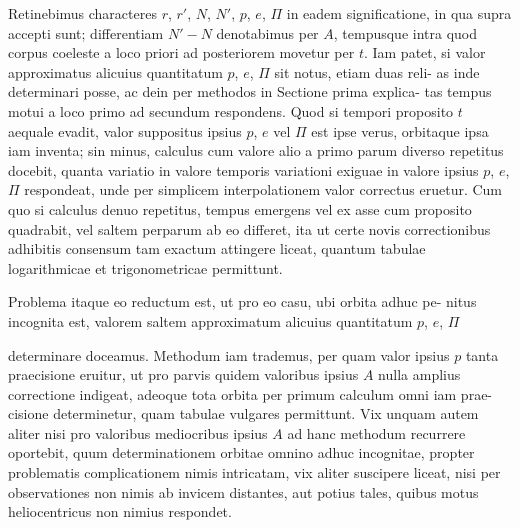 \documentclass[12pt,a4paper]{article}
\begin{document}
Retinebimus characteres $r$, $r'$, $N$, $N'$, $p$, $e$, $\Pi$ in eadem significatione, in qua
supra accepti sunt; differentiam $N' - N$ denotabimus per $A$, tempusque intra
quod corpus coeleste a loco priori ad posteriorem movetur per $t$. Iam patet, si
valor approximatus alicuius quantitatum $p$, $e$, $\Pi$ sit notus, etiam duas reli-
as inde determinari posse, ac dein per methodos in Sectione prima explica-
tas tempus motui a loco primo ad secundum respondens. Quod si tempori
proposito $t$ aequale evadit, valor suppositus ipsius $p$, $e$ vel $\Pi$ est ipse verus,
orbitaque ipsa iam inventa; sin minus, calculus cum valore alio a primo parum
diverso repetitus docebit, quanta variatio in valore temporis variationi exiguae
in valore ipsius $p$, $e$, $\Pi$ respondeat, unde per simplicem interpolationem valor
correctus eruetur. Cum quo si calculus denuo repetitus, tempus emergens
vel ex asse cum proposito quadrabit, vel saltem perparum ab eo differet, ita
ut certe novis correctionibus adhibitis consensum tam exactum attingere liceat,
quantum tabulae logarithmicae et trigonometricae permittunt.

Problema itaque eo reductum est, ut pro eo casu, ubi orbita adhuc pe-
nitus incognita est, valorem saltem approximatum alicuius quantitatum $p$, $e$, $\Pi$

determinare doceamus. Methodum iam trademus, per quam valor ipsius $p$
tanta praecisione eruitur, ut pro parvis quidem valoribus ipsius $A$ nulla amplius
correctione indigeat, adeoque tota orbita per primum calculum omni iam prae-
cisione determinetur, quam tabulae vulgares permittunt. Vix unquam autem
aliter nisi pro valoribus mediocribus ipsius $A$ ad hanc methodum recurrere
oportebit, quum determinationem orbitae omnino adhuc incognitae, propter
problematis complicationem nimis intricatam, vix aliter suscipere liceat, nisi
per observationes non nimis ab invicem distantes, aut potius tales, quibus
motus heliocentricus non nimius respondet.

\section{}
\end{document}
